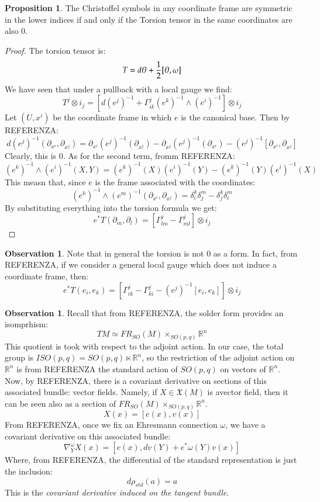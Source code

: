 \documentclass[12pt,a4paper]{report}
\theoremstyle{definition}
\theoremstyle{Theorem}
\newtheorem{Prop}[Def]{Proposition}
\theoremstyle{break}
\theoremstyle{definition}
\newtheorem{Obs}[Def]{Observation}
\begin{document}
		\begin{Prop}
			The Christoffel symbols in any coordinate frame are symmetric in the lower indices if and only if the Torsion tensor in the same coordinates are also 0.
		\end{Prop}
		\begin{proof}
			The torsion tensor is:
			$$T=d\theta+{1\over 2}[\theta,\omega]$$
			We have seen that under a pullback with a local gauge we find:
			$$T^j\otimes i_j=[d(e^j)^{-1}+ \Gamma^j_{ik}(e^k)^{-1}\wedge (e^i)^{-1}]\otimes i_j$$
			Let $(U,x^i)$ be the coordinate frame in which $e$ is the canonical base. Then by REFERENZA:
			$$d(e^j)^{-1}(\partial_{x^i},\partial_{x^j})=\partial_{x^i}(e^j)^{-1}(\partial_{x^j})-\partial_{x^j}(e^j)^{-1}(\partial_{x^i})-(e^j)^{-1}[\partial_{x^i},\partial_{x^j}]$$
			Clearly, this is 0. As for the second term, fromm REFERENZA:
			$$(e^k)^{-1}\wedge (e^i)^{-1}(X,Y)=(e^k)^{-1}(X) (e^i)^{-1}(Y)-(e^k)^{-1}(Y) (e^i)^{-1}(X)$$
			This measn that, since $e$ is the frame associated with the coordinates:
			$$(e^k)^{-1}\wedge (e^m)^{-1}(\partial_{x^i},\partial_{x^j})=\delta^k_i\delta^m_j-\delta^k_j\delta^m_i$$
			By substituting everything into the torsion formula we get:
			$$e^*T(\partial_m,\partial_l)=[\Gamma^j_{lm}-\Gamma^j_{ml}]\otimes i_j$$
		\end{proof}
		\begin{Obs}
			Note that in general the torsion is not 0 as a form. In fact, from REFERENZA, if we consider a general local gauge which does not induce a coordinate frame, then:
			$$e^*T(e_i,e_k)=[\Gamma^j_{ik}-\Gamma^j_{ki}-(e^j)^{-1}[e_i,e_k]]\otimes i_j$$
		\end{Obs}
		\begin{Obs}
			Recall that from REFERENZA, the solder form provides an isomprhism:
			$$TM\simeq FR_{SO}(M)\times_{SO(p,q)} \mathbb{R}^n$$
			This quotient is took with respect to the adjoint action. 
			In our case, the total group is $ISO(p,q)=SO(p,q)\ltimes \mathbb{R}^n$, so the restriction of the adjoint action on $\mathbb{R}^n$ is from REFERENZA the standard action of $SO(p,q)$ on vectors of $\mathbb{R}^n$.\\
			Now, by REFERENZA, there is a covariant derivative on sections of this associated bundle: vector fields. Namely, if $X\in\mathfrak{X}(M)$ is  avector field, then it can be seen also as a section of $FR_{SO}(M)\times_{SO(p,q)} \mathbb{R}^n$.
			$$X(x)=[e(x),v(x)]$$
			From REFERENZA, once we fix an Ehresmann connection $\omega$, we have a covariant derivative on this associated bundle:
			$$\nabla_Y^\omega X(x)=[e(x),dv(Y)+e^*\omega(Y)v(x)]$$
			Where, from REFERENZA, the differential of the standard representation is just the inclusion:
			$$d\rho_{std}(a)=a$$
			This is the \textit{covariant derivative induced on the tangent bundle}.
		\end{Obs}
\end{document}
